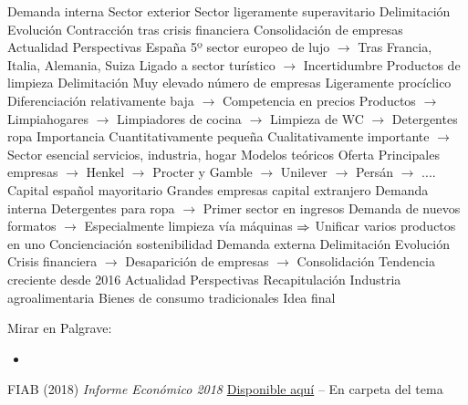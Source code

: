 \documentclass{nuevotema}
\begin{document}
\begin{esquemal}
				\4 Demanda interna
				\4 Sector exterior
				\4[] Sector ligeramente superavitario
				\4 Delimitación
				\4 Evolución
				\4[] Contracción tras crisis financiera
				\4[] Consolidación de empresas
				\4 Actualidad
				\4 Perspectivas
				\4[] España 5º sector europeo de lujo
				\4[] $\to$ Tras Francia, Italia, Alemania, Suiza
				\4[] Ligado a sector turístico
				\4[] $\to$ Incertidumbre
			\3 Productos de limpieza
				\4 Delimitación
				\4[] Muy elevado número de empresas
				\4[] Ligeramente procíclico
				\4[] Diferenciación relativamente baja
				\4[] $\to$ Competencia en precios
				\4[] Productos
				\4[] $\to$ Limpiahogares
				\4[] $\to$ Limpiadores de cocina
				\4[] $\to$ Limpieza de WC
				\4[] $\to$ Detergentes ropa
				\4 Importancia
				\4[] Cuantitativamente pequeña
				\4[] Cualitativamente importante
				\4[] $\to$ Sector esencial servicios, industria, hogar
				\4 Modelos teóricos
				\4 Oferta
				\4[] Principales empresas
				\4[] $\to$ Henkel
				\4[] $\to$ Procter y Gamble
				\4[] $\to$ Unilever
				\4[] $\to$ Persán
				\4[] $\to$ ....
				\4[] Capital español mayoritario
				\4[] Grandes empresas capital extranjero
				\4 Demanda interna
				\4[] Detergentes para ropa
				\4[] $\to$ Primer sector en ingresos
				\4[] Demanda de nuevos formatos
				\4[] $\to$ Especialmente limpieza vía máquinas
				\4[] $\Rightarrow$ Unificar varios productos en uno
				\4[] Concienciación sostenibilidad
				\4 Demanda externa
				\4 Delimitación
				\4 Evolución
				\4[] Crisis financiera
				\4[] $\to$ Desaparición de empresas
				\4[] $\to$ Consolidación
				\4[] Tendencia creciente desde 2016
				\4 Actualidad
				\4 Perspectivas
				\4[]
	\1[] 
		\2 Recapitulación
			\3 Industria agroalimentaria
			\3 Bienes de consumo tradicionales
		\2 Idea final
			
\end{esquemal}


\graficas

\conceptos

\preguntas

\notas


\bibliografia

Mirar en Palgrave:
\begin{itemize}
	\item 
\end{itemize}


FIAB (2018) \textit{Informe Económico 2018} \href{http://fiab.es/es/archivos/documentos/FIAB_INFORME_ECONOMICO_2018.pdf}{Disponible aquí} -- En carpeta del tema
\end{document}
